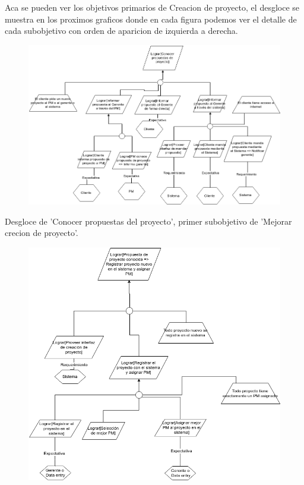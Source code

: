 Aca se pueden ver los objetivos primarios de Creacion de proyecto, el desgloce se muestra en los proximos graficos donde en cada figura podemos ver el detalle de cada subobjetivo con orden de aparicion de izquierda a derecha.

\vspace{1em}

\begin{figure}[H]
    \centering
    \includegraphics[width=\textwidth]{imagenes/objetivos-creacion-1.png}
\end{figure}

Desgloce de 'Conocer propuestas del proyecto', primer subobjetivo de 'Mejorar crecion de proyecto'.

\vspace{1em}

\begin{figure}[H]
    \centering
    \includegraphics[width=\textwidth]{imagenes/objetivos-creacion-2.png}
\end{figure}

